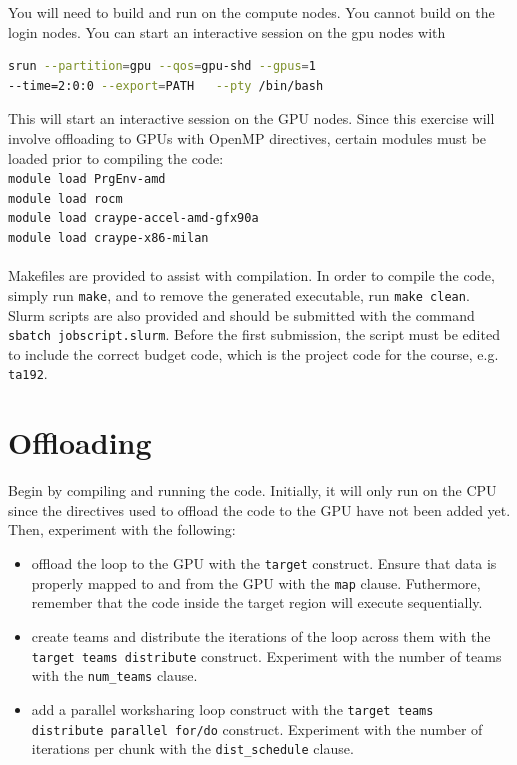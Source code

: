 You will need to build and run on the compute nodes. You cannot build on the login nodes.
You can start an interactive session on the gpu nodes with

\begin{lstlisting}[language=Bash]
srun --partition=gpu --qos=gpu-shd --gpus=1
--time=2:0:0 --export=PATH   --pty /bin/bash
\end{lstlisting}
This will start an interactive session on the GPU nodes.
\noindent Since this exercise will involve offloading to GPUs with OpenMP directives, certain modules must be loaded prior to compiling the code: \\

\texttt{module load PrgEnv-amd} \\
\indent \texttt{module load rocm} \\
\indent \texttt{module load craype-accel-amd-gfx90a} \\
\indent \texttt{module load craype-x86-milan} 
\\~\\
\noindent Makefiles are provided to assist with compilation. In order to compile the code, simply run \texttt{make}, and to remove the generated executable, run \texttt{make clean}. \\

\noindent Slurm scripts are also provided and should be submitted with the command \texttt{sbatch jobscript.slurm}. Before the first submission, the script must be edited to include the correct budget code, which is the project code for the course, e.g. \texttt{ta192}. 


\section{Offloading}

Begin by compiling and running the code. Initially, it will only run on the CPU since the directives used to offload the code to the GPU have not been added yet. \\

\noindent Then, experiment with the following:



\begin{itemize}
    \item offload the loop to the GPU with the \texttt{target} construct. Ensure that data is properly mapped to and from the GPU with the \texttt{map} clause. Futhermore, remember that the code inside the target region will execute sequentially.
    \item create teams and distribute the iterations of the loop across them with the \texttt{target teams distribute} construct. Experiment with the number of teams with the \texttt{num\_teams} clause.
    \item add a parallel worksharing loop construct with the \texttt{target teams distribute parallel for/do} construct. Experiment with the number of iterations per chunk with the \texttt{dist\_schedule} clause.
\end{itemize}



